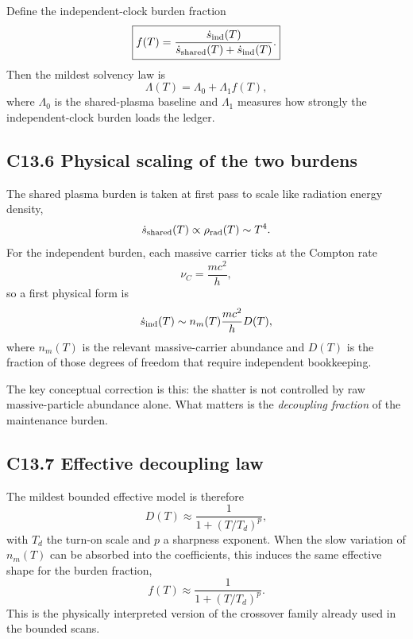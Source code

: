 \documentclass[11pt]{article}
\begin{document}
Define the independent-clock burden fraction
\begin{equation}
\boxed{f(T)=\frac{\dot s_{\rm ind}(T)}{\dot s_{\rm shared}(T)+\dot s_{\rm ind}(T)}.}
\end{equation}
Then the mildest solvency law is
\begin{equation}
\boxed{\Lambda(T)=\Lambda_0+\Lambda_1 f(T),}
\end{equation}
where $\Lambda_0$ is the shared-plasma baseline and $\Lambda_1$ measures how strongly the independent-clock burden loads the ledger.

\subsection*{C13.6 Physical scaling of the two burdens}
The shared plasma burden is taken at first pass to scale like radiation energy density,
\begin{equation}
\dot s_{\rm shared}(T)\propto \rho_{\rm rad}(T)\sim T^4.
\end{equation}
For the independent burden, each massive carrier ticks at the Compton rate
\begin{equation}
\nu_C=\frac{mc^2}{h},
\end{equation}
so a first physical form is
\begin{equation}
\dot s_{\rm ind}(T)\sim n_m(T)\frac{mc^2}{h}D(T),
\end{equation}
where $n_m(T)$ is the relevant massive-carrier abundance and $D(T)$ is the fraction of those degrees of freedom that require independent bookkeeping.

The key conceptual correction is this: the shatter is not controlled by raw massive-particle abundance alone. What matters is the \emph{decoupling fraction} of the maintenance burden.

\subsection*{C13.7 Effective decoupling law}
The mildest bounded effective model is therefore
\begin{equation}
\boxed{D(T)\approx \frac{1}{1+(T/T_d)^p},}
\end{equation}
with $T_d$ the turn-on scale and $p$ a sharpness exponent. When the slow variation of $n_m(T)$ can be absorbed into the coefficients, this induces the same effective shape for the burden fraction,
\begin{equation}
\boxed{f(T)\approx \frac{1}{1+(T/T_d)^p}.}
\end{equation}
This is the physically interpreted version of the crossover family already used in the bounded scans.
\end{document}
